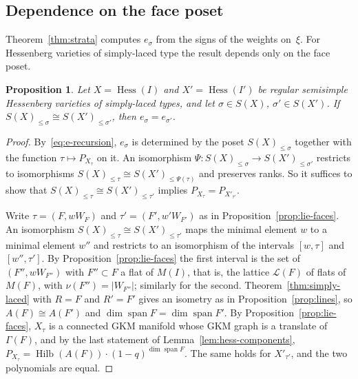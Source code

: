 \documentclass[11pt,a4paper]{article}
\numberwithin{equation}{section}
\theoremstyle{plain}
\newtheorem{proposition}[theorem]{Proposition}
\theoremstyle{definition}
\theoremstyle{remark}
\newcommand{\cL}{\mathcal{L}}
\DeclareMathOperator{\Hess}{Hess}
\DeclareMathOperator{\spn}{span}
\DeclareMathOperator{\Hilb}{Hilb}
\begin{document}
\subsection{Dependence on the face poset}
Theorem~\ref{thm:strata} computes $e_\sigma$ from the signs of the weights on~$\xi$. For Hessenberg varieties of simply-laced type the result depends only on the face poset.

\begin{proposition}\label{prop:e-poset}
Let $X=\Hess(I)$ and $X'=\Hess(I')$ be regular semisimple Hessenberg varieties of simply-laced types, and let $\sigma\in S(X)$, $\sigma'\in S(X')$. If $S(X)_{\leqslant\sigma}\cong S(X')_{\leqslant\sigma'}$, then $e_\sigma=e_{\sigma'}$.
\end{proposition}

\begin{proof}
By~\eqref{eq:e-recursion}, $e_\sigma$ is determined by the poset $S(X)_{\leqslant\sigma}$ together with the function $\tau\mapsto P_{X_\tau}$ on it. An isomorphism $\Psi\colon S(X)_{\leqslant\sigma}\to S(X')_{\leqslant\sigma'}$ restricts to isomorphisms $S(X)_{\leqslant\tau}\cong S(X')_{\leqslant\Psi(\tau)}$ and preserves ranks. So it suffices to show that $S(X)_{\leqslant\tau}\cong S(X')_{\leqslant\tau'}$ implies $P_{X_\tau}=P_{X'_{\tau'}}$.

Write $\tau=(F,wW_F)$ and $\tau'=(F',w'W_{F'})$ as in Proposition~\ref{prop:lie-faces}. An isomorphism $S(X)_{\leqslant\tau}\cong S(X')_{\leqslant\tau'}$ maps the minimal element $w$ to a minimal element $w''$ and restricts to an isomorphism of the intervals $[w,\tau]$ and $[w'',\tau']$. By Proposition~\ref{prop:lie-faces} the first interval is the set of $(F'',wW_{F''})$ with $F''\subset F$ a flat of $M(I)$, that is, the lattice $\cL(F)$ of flats of $M(F)$, with $\nu(F'')=|W_{F''}|$; similarly for the second. Theorem~\ref{thm:simply-laced} with $R=F$ and $R'=F'$ gives an isometry as in Proposition~\ref{prop:lines}, so $A(F)\cong A(F')$ and $\dim\spn F=\dim\spn F'$. By Proposition~\ref{prop:lie-faces}, $X_\tau$ is a connected GKM manifold whose GKM graph is a translate of $\Gamma(F)$, and by the last statement of Lemma~\ref{lem:hess-components}, $P_{X_\tau}=\Hilb(A(F))\cdot(1-q)^{\dim\spn F}$. The same holds for $X'_{\tau'}$, and the two polynomials are equal.
\end{proof}
\end{document}
